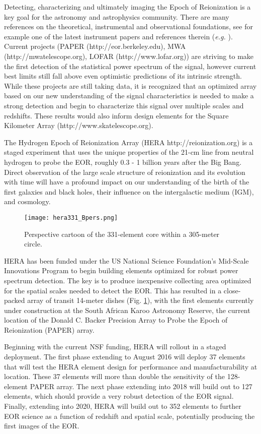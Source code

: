 \documentclass{ICEAA-IEEE_APWC}
\begin{document}
Detecting, characterizing and ultimately imaging the Epoch of Reionization is a key goal for the astronomy and astrophysics community. There are many references on the theoretical, instrumental and observational foundations, see for example one of the latest instrument papers and references therein ({\em e.g.} {\cite{2015arXiv150206016A}}).  Current projects (PAPER (http://eor.berkeley.edu), MWA (http://mwatelescope.org), LOFAR (http://www.lofar.org)) are striving to make the first detection of the statistical power spectrum of the signal, however current best limits still fall above even optimistic predictions of its intrinsic strength.  While these projects are still taking data, it is recognized that an optimized array based on our new understanding of the signal characteristics is needed to make a strong detection and begin to characterize this signal over multiple scales and redshifts.  These results would also inform design elements for the Square Kilometer Array (http://www.skatelescope.org).

The Hydrogen Epoch of Reionization Array (HERA http://reionization.org) is a staged experiment that uses the unique properties of the 21-cm line from neutral hydrogen to probe the EOR, roughly 0.3 - 1 billion years after the Big Bang. Direct observation of the large scale structure of reionization and its evolution with time will have a profound impact on our understanding of the birth of the first galaxies and black holes, their influence on the intergalactic medium (IGM), and cosmology.

\begin{figure}[t]
\centerline{
\texttt{[image: hera331\_Bpers.png]} }
\caption{\small Perspective cartoon of the 331-element core within a 305-meter circle.
\label{fig:config}}
\end{figure}

HERA has been funded under the US National Science Foundation's Mid-Scale Innovations Program to begin building elements optimized for robust power spectrum detection.  The key is to produce inexpensive collecting area optimized for the spatial scales needed to detect the EOR.  This has resulted in a close-packed array of transit 14-meter dishes (Fig. \ref{fig:config}), with the first elements currently under construction at the South African Karoo Astronomy Reserve, the current location of the Donald C. Backer Precision Array to Probe the Epoch of Reionization (PAPER) array.

Beginning with the current NSF funding, HERA will rollout in a staged deployment.  The first phase extending to August 2016 will deploy 37 elements that will test the HERA element design for performance and manufacturability at location.  These 37 elements will more than double the sensitivity of the 128-element PAPER array.  The next phase extending into 2018 will build out to 127 elements, which should provide a very robust detection of the EOR signal.  Finally, extending into 2020, HERA will build out to 352 elements to further EOR science as a function of redshift and spatial scale, potentially producing the first images of the EOR.
\end{document}
